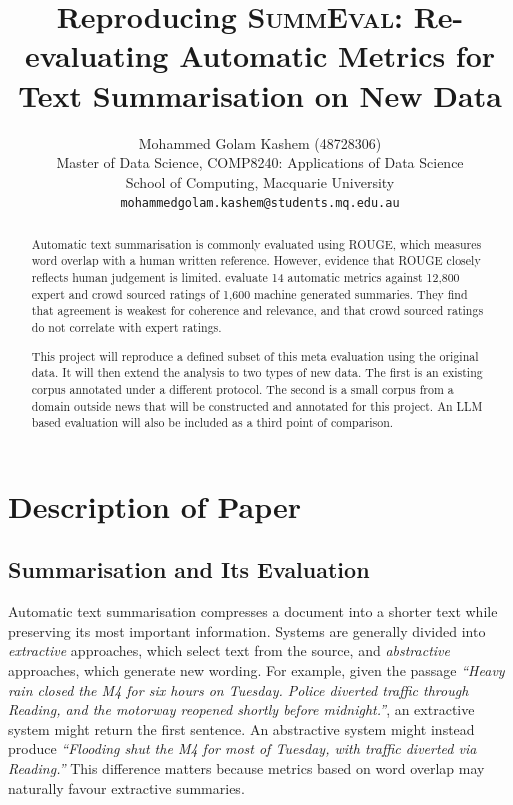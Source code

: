 \documentclass[11pt]{article}
\title{Reproducing \textsc{SummEval}: Re-evaluating Automatic Metrics for
       Text Summarisation on New Data}
\author{
  Mohammed Golam Kashem (48728306)\\
  Master of Data Science, COMP8240: Applications of Data Science \\
  School of Computing, Macquarie University \\
  \texttt{mohammedgolam.kashem@students.mq.edu.au} \\
}
\begin{document}
\maketitle

\begin{abstract}
Automatic text summarisation is commonly evaluated using ROUGE, which measures word overlap with a human written reference. However, evidence that ROUGE closely reflects human judgement is limited. \citet{fabbri-etal-2021-summeval} evaluate 14 automatic metrics against 12{,}800 expert and crowd sourced ratings of 1{,}600 machine generated summaries. They find that agreement is weakest for coherence and relevance, and that crowd sourced ratings do not correlate with expert ratings.

This project will reproduce a defined subset of this meta evaluation using the original data. It will then extend the analysis to two types of new data. The first is an existing corpus annotated under a different protocol. The second is a small corpus from a domain outside news that will be constructed and annotated for this project. An LLM based evaluation will also be included as a third point of comparison.
\end{abstract}

\section{Description of Paper}
\label{sec:paper}

\subsection{Summarisation and Its Evaluation}

Automatic text summarisation compresses a document into a shorter text while preserving its most important information. Systems are generally divided into \emph{extractive} approaches, which select text from the source, and \emph{abstractive} approaches, which generate new wording. For example, given the passage \textit{``Heavy rain closed the M4 for six hours on Tuesday. Police diverted traffic through Reading, and the motorway reopened shortly before midnight.''}, an extractive system might return the first sentence. An abstractive system might instead produce \textit{``Flooding shut the M4 for most of Tuesday, with traffic diverted via Reading.''} This difference matters because metrics based on word overlap may naturally favour extractive summaries.
\end{document}
